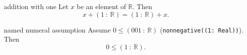 \begin{cleanresult}{addition with one}
Let $x$ be an element of $\mathbb{R}$.
Then \[x+\left(1 \: : \: \mathbb{R}\right)=\left(1 \: : \: \mathbb{R}\right)+x.\]
\end{cleanresult}

\begin{cleanresult}{named numeral assumption}
Assume $0\le \left(001 \: : \: \mathbb{R}\right)$ (\texttt{nonnegative((1: Real))}).
Then \[0\le \left(1 \: : \: \mathbb{R}\right).\]
\end{cleanresult}

